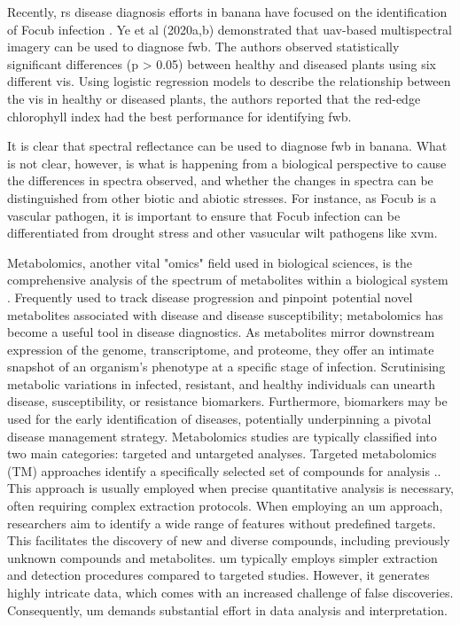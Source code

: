 Recently, \acf{rs} disease diagnosis efforts in banana have focused on the identification of \ac{Focub} infection \parencite{Ye2020a, Ye2020b, Selvaraj2019}.  Ye et al (2020a,b) demonstrated that \ac{uav}-based multispectral imagery can be used to diagnose \ac{fwb}. The authors observed statistically significant differences (p > 0.05) between healthy and diseased plants using six different \acp{vi}. Using logistic regression models to describe the relationship between the \acp{vi} in healthy or diseased plants, the authors reported that the red-edge chlorophyll index had the best performance for identifying \ac{fwb}.  

It is clear that spectral reflectance can be used to diagnose \ac{fwb} in banana. What is not clear, however, is what is happening from a biological perspective to cause the differences in spectra observed, and whether the changes in spectra can be distinguished from other biotic and abiotic stresses. For instance, as \ac{Focub} is a vascular pathogen, it is important to ensure that \ac{Focub} infection can be differentiated from drought stress and other vasucular wilt pathogens like \acf{xvm}. 

Metabolomics, another vital "omics" field used in biological sciences, is the comprehensive analysis of the spectrum of metabolites within a biological system \parencite{Klassen2017}. Frequently used to track disease progression and pinpoint potential novel metabolites associated with disease and disease susceptibility; metabolomics has become a useful tool in disease diagnostics. As metabolites mirror downstream expression of the genome, transcriptome, and proteome, they offer an intimate snapshot of an organism's phenotype at a specific stage of infection. Scrutinising metabolic variations in infected, resistant, and healthy individuals can unearth disease, susceptibility, or resistance biomarkers. Furthermore, biomarkers may be used for the early identification of diseases, potentially underpinning a pivotal disease management strategy. 
Metabolomics studies are typically classified into two main categories: targeted and untargeted analyses. Targeted metabolomics (TM) approaches identify a specifically selected set of compounds for analysis \parencite{Allwood2021}.. This approach is usually employed when precise quantitative analysis is necessary, often requiring complex extraction protocols. When employing an \ac{um} approach, researchers aim to identify a wide range of features without predefined targets. This facilitates the discovery of new and diverse compounds, including previously unknown compounds and metabolites. \ac{um} typically employs simpler extraction and detection procedures compared to targeted studies. However, it generates highly intricate data, which comes with an increased challenge of false discoveries. Consequently, \ac{um} demands substantial effort in data analysis and interpretation.

